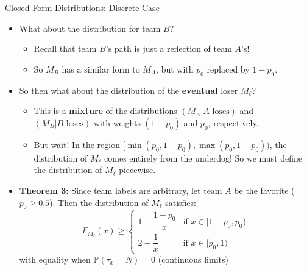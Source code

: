 \documentclass{beamer}
\begin{document}
\begin{frame}{Closed-Form Distributions: Discrete Case}
  \begin{itemize}
    \item What about the distribution for team $B$?
    \pause
    \begin{itemize}
      \item Recall that team $B$'s path is just a reflection of team $A$'s!
      \pause
      \item So $M_B$ has a similar form to $M_A$, but with $p_0$ replaced by $1 - p_0$.
    \end{itemize}
    \pause
    \item So then what about the distribution of the \textbf{eventual} loser $M_\ell$?
    \pause
    \begin{itemize}
      \item This is a \textbf{mixture} of the distributions $(M_A | A \text{ loses})$ and $(M_B | B \text{ loses})$ with weights $(1 - p_0)$ and $p_0$, respectively.
      \pause
      \item But wait! In the region $[\min(p_0, 1-p_0), \max(p_0, 1-p_0))$, the distribution of $M_\ell$ comes entirely from the underdog! So we must define the distribution of $M_\ell$ piecewise.
    \end{itemize}
    \pause
    \item \textbf{Theorem 3:} Since team labels are arbitrary, let team $A$ be the favorite ($p_0 \geq 0.5$). Then the distribution of $M_\ell$ satisfies:
    \begin{equation*}
      F_{M_\ell}(x) \geq \begin{cases}
        1 - \dfrac{1-p_0}{x} & \text{if } x \in [1 - p_0, p_0) \\
        2 - \dfrac{1}{x} & \text{if } x \in [p_0, 1)
      \end{cases}
    \end{equation*}
    with equality when $\mathbb{P}(\tau_x = N) = 0$ (continuous limits)
  \end{itemize}
\end{frame}
 
\end{document}
